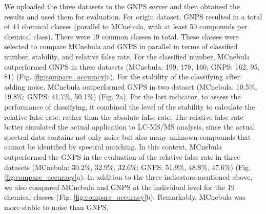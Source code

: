 \documentclass[
]{article}
\begin{document}
We uploaded the three datasets to the GNPS server and then obtained the
results and used them for evaluation. For origin dataset, GNPS resulted
in a total of 44 chemical classes (parallel to MCnebula, with at least
50 compounds per chemical class). There were 19 common classes in total.
These classes were selected to compare MCnebula and GNPS in parallel in
terms of classified number, stability, and relative false rate. For the
classified number, MCnebula outperformed GNPS in three datasets
(MCnebula: 199, 178, 160; GNPS: 162, 95, 81) (Fig.
\ref{fig:compare_accuracy}a). For the stability of the classifying after
adding noise, MCnebula outperformed GNPS in two dataset (MCnebula:
10.5\%, 19.8\%; GNPS: 41.7\%, 50.1\%) (Fig. 2a). For the last indicator,
to assess the performance of classifying, it combined the level of the
stability to calculate the relative false rate, rather than the absolute
false rate. The relative false rate better simulated the actual
application to LC-MS/MS analysis, since the actual spectral data
contains not only noise but also many unknown compounds that cannot be
identified by spectral matching. In this context, MCnebula outperformed
the GNPS in the evaluation of the relative false rate in three datasets
(MCnebula: 30.2\%, 32.9\%, 32.6\%; GNPS: 51.9\%, 48.8\%, 47.6\%) (Fig.
\ref{fig:compare_accuracy}a). In addition to the three indicators
mentioned above, we also compared MCnebula and GNPS at the individual
level for the 19 chemical classes (Fig. \ref{fig:compare_accuracy}b).
Remarkably, MCnebula was more stable to noise than GNPS.
\end{document}
